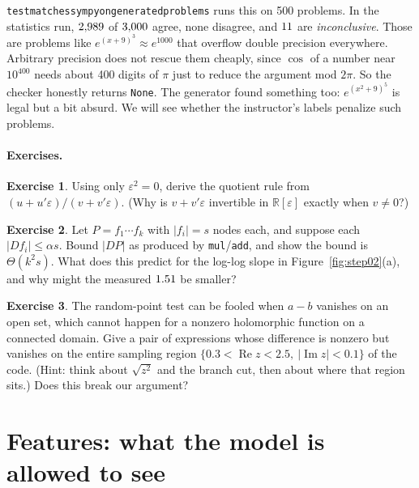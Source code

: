 \documentclass[11pt]{article}
\theoremstyle{definition}
\newtheorem{exercise}{Exercise}[section]
\theoremstyle{plain}
\theoremstyle{remark}
\newcommand{\R}{\mathbb{R}}
\newcommand{\code}[1]{\texttt{#1}}
\renewcommand{\_}{\oldunderscore\allowbreak}
\begin{document}
\code{test\_matches\_sympy\_on\_generated\_problems} runs this on 500 problems. In the statistics run,
$2{,}989$ of $3{,}000$ agree, none disagree, and $11$ are \emph{inconclusive}. Those are
problems like $e^{(x+9)^3}\approx e^{1000}$ that overflow double precision everywhere. Arbitrary precision does not
rescue them cheaply, since $\cos$ of a number near $10^{400}$ needs about 400 digits of $\pi$ just to reduce the
argument mod $2\pi$. So the checker honestly returns \code{None}. The generator found something too: $e^{(x^2+9)^5}$ is
legal but a bit absurd. We will see whether the instructor's labels penalize such problems.

\paragraph{Exercises.}
\begin{exercise}
Using only $\varepsilon^2=0$, derive the quotient rule from $(u+u'\varepsilon)/(v+v'\varepsilon)$.
(Why is $v+v'\varepsilon$ invertible in $\R[\varepsilon]$ exactly when $v\neq0$?)
\end{exercise}
\begin{exercise}
Let $P=f_1\cdots f_k$ with $|f_i|=s$ nodes each, and suppose each $|D f_i|\le\alpha s$. Bound $|D P|$ as produced by
\code{\_mul}/\code{\_add}, and show the bound is $\Theta(k^2s)$. What does this predict for the log-log slope in
Figure~\ref{fig:step02}(a), and why might the measured $1.51$ be smaller?
\end{exercise}
\begin{exercise}
The random-point test can be fooled when $a-b$ vanishes on an open set, which cannot happen for a nonzero holomorphic function on a connected domain.
Give a pair of expressions whose difference is nonzero but vanishes on the entire sampling region
$\{0.3<\operatorname{Re}z<2.5,\ |\operatorname{Im}z|<0.1\}$ of the code. (Hint: think about $\sqrt{z^2}$ and the branch cut,
then about where that region sits.) Does this break our argument?
\end{exercise}

\section{Features: what the model is allowed to see}
\label{sec:features}
\end{document}
